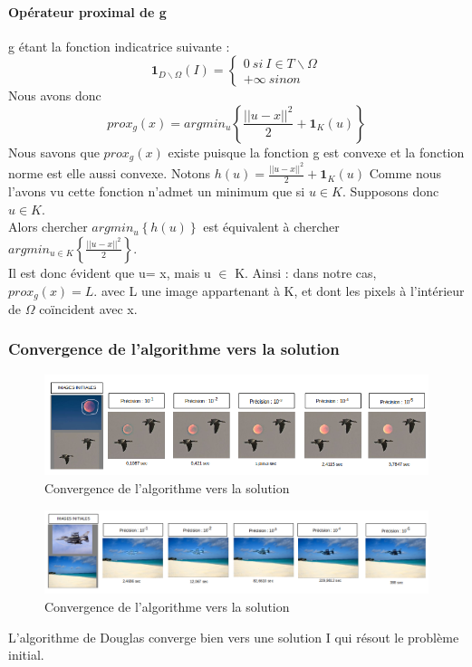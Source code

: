 \paragraph{Opérateur proximal de g}
g étant la fonction indicatrice suivante : 
\begin{equation*}
\mathbf{1}_{ D \backslash \Omega }(I) =
	\left\{
	\begin{aligned}{}
	0 \ si\  I \in T \backslash \Omega \\
	+ \infty \ sinon
    \end{aligned}
    \right.
\end{equation*}{}
Nous avons donc 
\begin{equation*}
prox_g(x) =  argmin_u\left\{\frac{||u-x||^2}{2}+ \mathbf{1}_K(u)\right\}
\end{equation*}
Nous savons que $prox_g(x)$ existe puisque la fonction g est convexe et la fonction norme est elle aussi convexe.\newline
Notons $h(u) = \frac{||u-x||^2}{2}+ \mathbf{1}_K(u)$ 
Comme nous l'avons vu cette fonction n'admet un minimum que si $u \in K$. Supposons donc $u \in K$.\\
 Alors chercher $argmin_u \left\{h(u)\right\}$ est équivalent à chercher $argmin_{u\in K} \left\{\frac{||u-x||^2}{2}\right\}$.\\
Il est donc évident que u= x, mais u $\in $ K. Ainsi : dans notre cas, $prox_g(x) = L$.
avec L une image appartenant à K, et dont les pixels à l'intérieur de $\Omega$ coïncident avec x.\\
\subsubsection{Convergence de l'algorithme vers la solution}
\begin{figure}[!htb]
\includegraphics[scale=0.6]{Images/Resultats/conv1.png}
\caption{Convergence de l'algorithme vers la solution}
\end{figure}
\begin{figure}[!htb]
\includegraphics[scale=0.4]{Images/Resultats/conv2.png}
\caption{Convergence de l'algorithme vers la solution}
\end{figure}
L'algorithme de Douglas converge bien vers une solution I qui résout le problème initial.
